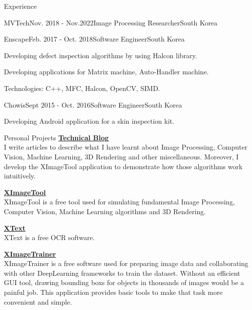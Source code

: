\documentclass{resume}
\begin{document}
\begin{rSection}{Experience}
\begin{rSubsection}{MVTech}{Nov. 2018 - Nov.2022}{Image Processing Researcher}{South Korea}
		\end{rSubsection}

		\begin{rSubsection}{Enscape}{Feb. 2017 - Oct. 2018}{Software Engineer}{South Korea}
			\item Developing defect inspection algorithms by using Halcon library.
			\item Developing applications for Matrix machine, Auto-Handler machine.
			\item Technologies: C++, MFC, Halcon, OpenCV, SIMD.

		\end{rSubsection}

		\begin{rSubsection}{Chowis}{Sept 2015 - Oct. 2016}{Software Engineer}{South Korea}
			\item Developing Android application for a skin inspection kit.

		\end{rSubsection}
	\end{rSection}

	\begin{rSection}{Personal Projects}
		{\bf \href{https://noidh.github.io/blog.html}{Technical Blog}}
		\\ I write articles to describe what I have learnt about Image Processing, Computer Vision, Machine Learning, 3D Rendering and other miscellaneous.  Moreover,  I develop the XImageTool application to demonstrate how those algorithms work intuitively.

		{\bf  \href{https://noidh.github.io/pages/sw/ximagetool/ximagetool.html}{XImageTool}}
		\\ XImageTool is a free tool used for simulating fundamental Image Processing, Computer Vision, Machine Learning algorithms and 3D Rendering.

		{\bf \href{https://noidh.github.io/pages/sw/ximage2text/ximagetotext.html}{XText}}
		\\ XText is a free OCR software.

		{\bf \href{https://noidh.github.io/pages/sw/ximage_trainer/ximage_trainer.html}{XImageTrainer}}
		\\XImageTrainer is a free software used for preparing image data and collaborating with other DeepLearning frameworks to train the dataset. Without an efficient GUI tool, drawing bounding boxs for objects in thousands of images would be a painful job.  This application provides basic tools to make that task more convenient and simple.	
	\end{rSection}
\end{document}
